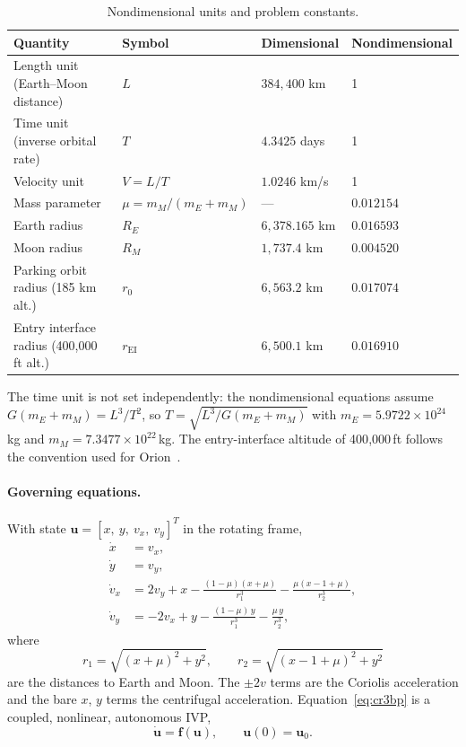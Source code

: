 \documentclass[11pt]{article}
\newcommand{\bu}{\mathbf{u}}
\newcommand{\bff}{\mathbf{f}}
\begin{document}
\begin{table}[h]
\centering
\caption{Nondimensional units and problem constants.}
\label{tab:units}
\begin{tabular}{@{}llll@{}}
\toprule
Quantity & Symbol & Dimensional & Nondimensional \\
\midrule
Length unit (Earth--Moon distance) & $L$ & $384{,}400$ km & 1 \\
Time unit (inverse orbital rate) & $T$ & $4.3425$ days & 1 \\
Velocity unit & $V = L/T$ & $1.0246$ km/s & 1 \\
Mass parameter & $\mu = m_M/(m_E+m_M)$ & --- & $0.012154$ \\
Earth radius & $R_E$ & $6{,}378.165$ km & $0.016593$ \\
Moon radius & $R_M$ & $1{,}737.4$ km & $0.004520$ \\
Parking orbit radius (185 km alt.) & $r_0$ & $6{,}563.2$ km & $0.017074$ \\
Entry interface radius (400{,}000 ft alt.) & $r_{\mathrm{EI}}$ & $6{,}500.1$ km & $0.016910$ \\
\bottomrule
\end{tabular}
\end{table}

\noindent The time unit is not set independently: the nondimensional equations assume $G(m_E + m_M) = L^3/T^2$, so $T = \sqrt{L^3/G(m_E+m_M)}$ with $m_E = 5.9722\times10^{24}$\,kg and $m_M = 7.3477\times10^{22}$\,kg. The entry-interface altitude of 400{,}000\,ft follows the convention used for Orion~\cite{rea_artemis1}.

\paragraph{Governing equations.} With state $\bu = [x,\ y,\ v_x,\ v_y]^T$ in the rotating frame,
\begin{equation}
\label{eq:cr3bp}
\begin{aligned}
\dot x &= v_x, \\
\dot y &= v_y, \\
\dot v_x &= 2v_y + x - \frac{(1-\mu)(x+\mu)}{r_1^3} - \frac{\mu(x-1+\mu)}{r_2^3}, \\
\dot v_y &= -2v_x + y - \frac{(1-\mu)\,y}{r_1^3} - \frac{\mu\,y}{r_2^3},
\end{aligned}
\end{equation}
where
\begin{equation}
r_1 = \sqrt{(x+\mu)^2 + y^2}, \qquad r_2 = \sqrt{(x-1+\mu)^2 + y^2}
\end{equation}
are the distances to Earth and Moon. The $\pm 2v$ terms are the Coriolis acceleration and the bare $x$, $y$ terms the centrifugal acceleration. Equation~\eqref{eq:cr3bp} is a coupled, nonlinear, autonomous IVP,
\begin{equation}
\dot{\bu} = \bff(\bu), \qquad \bu(0) = \bu_0 .
\end{equation}
\end{document}
